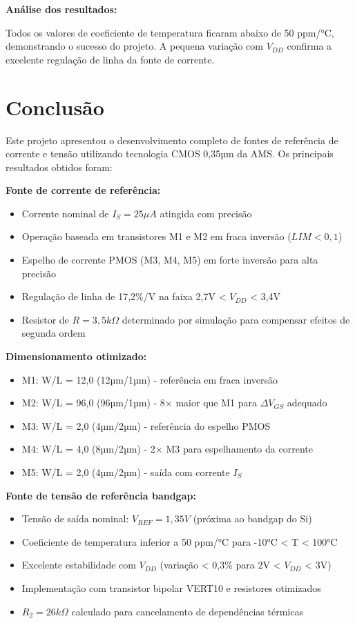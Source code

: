 ﻿\documentclass[12pt,a4paper]{article}
\begin{document}
\textbf{Análise dos resultados:}

Todos os valores de coeficiente de temperatura ficaram abaixo de 50 ppm/°C, demonstrando o sucesso do projeto. A pequena variação com $V_{DD}$ confirma a excelente regulação de linha da fonte de corrente.

\section*{Conclusão}

Este projeto apresentou o desenvolvimento completo de fontes de referência de corrente e tensão utilizando tecnologia CMOS 0,35µm da AMS. Os principais resultados obtidos foram:

\textbf{Fonte de corrente de referência:}
\begin{itemize}
    \item Corrente nominal de $I_S = 25\mu A$ atingida com precisão
    \item Operação baseada em transistores M1 e M2 em fraca inversão ($LIM < 0,1$)
    \item Espelho de corrente PMOS (M3, M4, M5) em forte inversão para alta precisão
    \item Regulação de linha de 17,2\%/V na faixa 2,7V < $V_{DD}$ < 3,4V
    \item Resistor de $R = 3,5k\Omega$ determinado por simulação para compensar efeitos de segunda ordem
\end{itemize}

\textbf{Dimensionamento otimizado:}
\begin{itemize}
    \item M1: W/L = 12,0 (12µm/1µm) - referência em fraca inversão
    \item M2: W/L = 96,0 (96µm/1µm) - 8× maior que M1 para $\Delta V_{GS}$ adequado  
    \item M3: W/L = 2,0 (4µm/2µm) - referência do espelho PMOS
    \item M4: W/L = 4,0 (8µm/2µm) - 2× M3 para espelhamento da corrente
    \item M5: W/L = 2,0 (4µm/2µm) - saída com corrente $I_S$
\end{itemize}

\textbf{Fonte de tensão de referência bandgap:}
\begin{itemize}
    \item Tensão de saída nominal: $V_{REF} = 1,35V$ (próxima ao bandgap do Si)
    \item Coeficiente de temperatura inferior a 50 ppm/°C para -10°C < T < 100°C
    \item Excelente estabilidade com $V_{DD}$ (variação < 0,3\% para 2V < $V_{DD}$ < 3V)
    \item Implementação com transistor bipolar VERT10 e resistores otimizados
    \item $R_2 = 26k\Omega$ calculado para cancelamento de dependências térmicas
\end{itemize}
\end{document}
